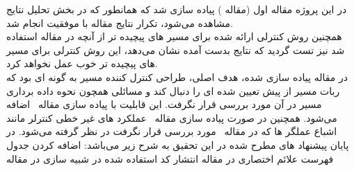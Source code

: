 در این پروژه مقاله اول (مقاله \آ) پیاده سازی شد که همانطور که در بخش تحلیل نتایج مشاهده می‌‌‌‌‌‌شود، تکرار نتایج مقاله با موفقیت انجام شد.\\
همچنین روش کنترلی ارائه شده برای مسیر های پیچیده تر از آنچه در مقاله استفاده شد نیز تست گردید که نتایج بدست آمده نشان می‌دهد، این روش کنترلی برای مسیر های پیچیده تر خوب عمل نخواهد کرد.\\
در مقاله پیاده سازی شده، هدف اصلی، طراحی کنترل کننده مسیر به گونه ای بود که ربات مسیر از پیش تعیین شده ای را دنبال کند و مسائلی همچون نحوه داده برداری مسیر در آن مورد بررسی قرار نگرفت. این قابلیت با پیاده سازی مقاله \ب\ اضافه می‌شود. همچنین در صورت پیاده سازی مقاله \پ\ عملکرد های غیر خطی کنترلر مانند اشباع عملگر ها که در مقاله \آ\ مورد بررسی قرار نگرفت در نظر گرفته می‌شود.  
در پایان  پیشنهاد های مطرح شده در این تحقیق به شرح زیر می‌باشد:
 اضافه کردن جدول فهرست علائم اختصاری در مقاله \آ
 انتشار کد استفاده شده در شبیه سازی در مقاله \آ
